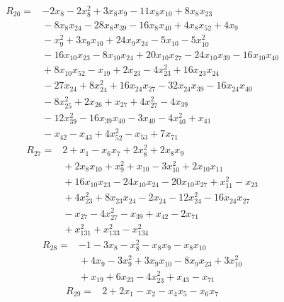 {\begin{align*}
\end{align*}
\begin{align*}
R_{26} ={}& -2x_{8} - 2x_{8}^{2} + 3x_{8} x_{9} - 11x_{8} x_{10} + 8x_{8} x_{23} \\
&{}  - 8x_{8} x_{24} - 28x_{8} x_{39} - 16x_{8} x_{40} + 4x_{8} x_{52} + 4x_{9} \\
&{}  - x_{9}^{2} + 3x_{9} x_{10} + 24x_{9} x_{24} - 5x_{10} - 5x_{10}^{2} \\
&{}  - 16x_{10} x_{23} - 8x_{10} x_{24} + 20x_{10} x_{27} - 24x_{10} x_{39} - 16x_{10} x_{40} \\
&{}  + 8x_{10} x_{52} - x_{19} + 2x_{23} - 4x_{23}^{2} + 16x_{23} x_{24} \\
&{}  - 27x_{24} + 8x_{24}^{2} + 16x_{24} x_{27} - 32x_{24} x_{39} - 16x_{24} x_{40} \\
&{}  - 8x_{25}^{2} + 2x_{26} + x_{27} + 4x_{27}^{2} - 4x_{39} \\
&{}  - 12x_{39}^{2} - 16x_{39} x_{40} - 3x_{40} - 4x_{40}^{2} + x_{41} \\
&{}  - x_{42} - x_{43} + 4x_{52}^{2} - x_{53} + 7x_{71}
\end{align*}
\begin{align*}
R_{27} ={}& 2 + x_{1} - x_{6} x_{7} + 2x_{8}^{2} + 2x_{8} x_{9} \\
&{}  + 2x_{8} x_{10} + x_{9}^{2} + x_{10} - 3x_{10}^{2} + 2x_{10} x_{11} \\
&{}  + 16x_{10} x_{23} - 24x_{10} x_{24} - 20x_{10} x_{27} + x_{11}^{2} - x_{23} \\
&{}  + 4x_{23}^{2} + 8x_{23} x_{24} - 2x_{24} - 12x_{24}^{2} - 16x_{24} x_{27} \\
&{}  - x_{27} - 4x_{27}^{2} - x_{39} + x_{42} - 2x_{71} \\
&{}  + x_{131}^{2} + x_{133}^{2} - x_{134}^{2}
\end{align*}
\begin{align*}
R_{28} ={}& -1 - 3x_{8} - x_{8}^{2} - x_{8} x_{9} - x_{8} x_{10} \\
&{}  + 4x_{9} - 3x_{9}^{2} + 3x_{9} x_{10} - 8x_{9} x_{23} + 3x_{10}^{2} \\
&{}  + x_{19} + 6x_{23} - 4x_{23}^{2} + x_{43} - x_{71}
\end{align*}
\begin{align*}
R_{29} ={}& 2 + 2x_{1} - x_{2} - x_{4} x_{5} - x_{6} x_{7} \\

\end{align*}}
